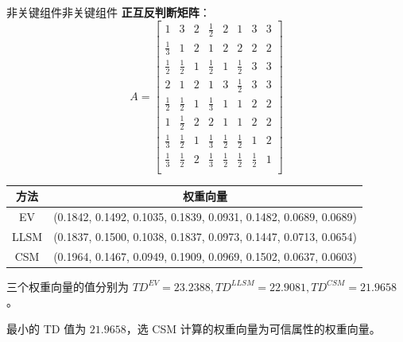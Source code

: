 \documentclass[14pt,a4paper,UTF8,twoside]{article}
\begin{document}
\begin{ans}{非关键组件}{非关键组件}
    \textbf{正互反判断矩阵}：
    \[
    A = 
    \begin{bmatrix}
    1 & 3 & 2 & \frac{1}{2} & 2 & 1 & 3 & 3 \\
    \frac{1}{3} & 1 & 2 & 1 & 2 & 2 & 2 & 2 \\
    \frac{1}{2} & \frac{1}{2} & 1 & \frac{1}{2} & 1 & \frac{1}{2} & 3 & 3 \\
    2 & 1 & 2 & 1 & 3 & \frac{1}{2} & 3 & 3 \\
    \frac{1}{2} & \frac{1}{2} & 1 & \frac{1}{3} & 1 & 1 & 2 & 2 \\
    1 & \frac{1}{2} & 2 & 2 & 1 & 1 & 2 & 2 \\
    \frac{1}{3} & \frac{1}{2} & 1 & \frac{1}{3} & \frac{1}{2} & \frac{1}{2} & 1 & 2 \\
    \frac{1}{3} & \frac{1}{2} & 2 & \frac{1}{3} & \frac{1}{2} & \frac{1}{2} & \frac{1}{2} & 1 \\
    \end{bmatrix}
    \]
  \end{ans}
    
  \bigskip
    
  \begin{table}[H]
    \centering
    \begin{tabular}{c|c}
    \hline
    方法 & 权重向量 \\ 
    \hline
    EV   & (0.1842, 0.1492, 0.1035, 0.1839, 0.0931, 0.1482, 0.0689, 0.0689) \\ 
    LLSM & (0.1837, 0.1500, 0.1038, 0.1837, 0.0973, 0.1447, 0.0713, 0.0654) \\ 
    CSM  & (0.1964, 0.1467, 0.0949, 0.1909, 0.0969, 0.1502, 0.0637, 0.0603) \\ 
    \hline
    \end{tabular}
  \end{table}
  
  \begin{center}
  三个权重向量的值分别为 $ TD^{EV} = 23.2388, TD^{LLSM} = 22.9081, TD^{CSM} = 21.9658 $。
  
  最小的 TD 值为 $ 21.9658 $，选 CSM 计算的权重向量为可信属性的权重向量。
  \end{center}
\end{document}
